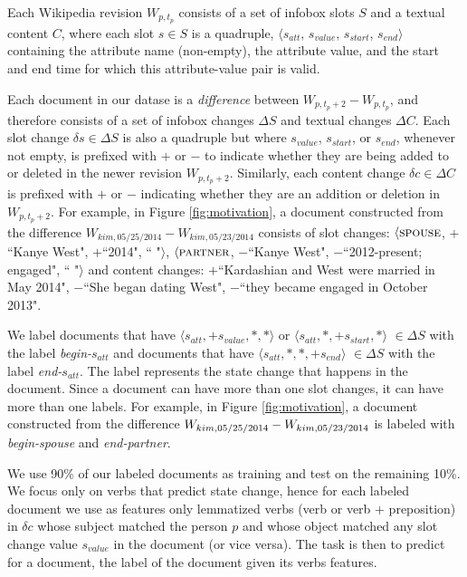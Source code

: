 Each Wikipedia revision $W_{p, t_p}$ consists of a set of infobox slots $S$ and a textual content $C$, where each slot $s \in S$ is a quadruple, $\langle s_{att}$, $s_{value}$,  $s_{start}$, $s_{end} \rangle$ containing the attribute name (non-empty), the attribute value, and the start and end time for which this attribute-value pair is valid. 

Each document in our datase is a \textit{difference} between $W_{p, t_p+2} - W_{p, t_p}$, and therefore consists of a set of infobox changes $\Delta S$ and textual changes $\Delta C$. Each slot change $\delta s \in \Delta S$ is also a quadruple %
but where $s_{value}$,  $s_{start}$, or $s_{end}$, whenever not empty, is prefixed with $+$ or $-$ to indicate whether they are being added to or deleted in the newer revision $W_{p, t_p+2}$. Similarly, each content change $\delta c \in \Delta C$ is prefixed with $+$ or $-$ indicating whether they are an addition or deletion in $W_{p, t_p+2}$. %
For example, in Figure \ref{fig:motivation}, a document constructed from the difference $W_{kim, 05/25/2014} - W_{kim, 05/23/2014}$ consists of slot changes: $\langle\textsc{spouse}$, \textbf{$+$}``Kanye West",  $+$``2014", `` "$\rangle$, $\langle\textsc{partner}$, $-$``Kanye West",  $-$``2012-present; engaged", `` "$\rangle$ and content changes: $+$``Kardashian and West were married in May 2014", $-$``She began dating West", $-$``they became engaged in October 2013".

We label documents that have $\langle s_{att}, +s_{value}, *, *\rangle$ or $\langle s_{att}, *, +s_{start}, *\rangle$ $\in \Delta S$ with the label \textit{begin-}$s_{att}$ and documents that have $\langle s_{att}, *, *, +s_{end}\rangle$ $\in \Delta S$ with the label \textit{end-}$s_{att}$. The label represents the state change that happens in the document. Since a document can have more than one slot changes, it can have more than one labels. %
For example, in Figure \ref{fig:motivation}, a document constructed from the difference $W_{kim,\tiny 05/25/2014\normalsize } - W_{kim, \tiny 05/23/2014\normalsize }$ is labeled with \textit{begin-spouse} and \textit{end-partner}. 

We use 90\% of our labeled documents as training and test on the remaining 10\%. We focus only on verbs that predict state change, hence for each labeled document we use as features only lemmatized verbs (verb or verb + preposition) in $\delta c$ whose subject matched the person $p$ and whose object matched any slot change value $s_{value}$ in the document (or vice versa). The task is then to predict for a document, the label of the document given its verbs features. 

